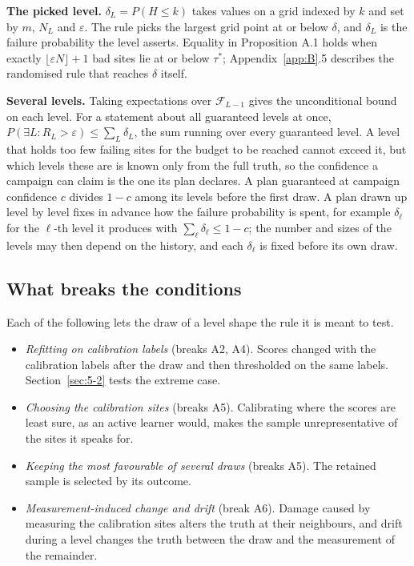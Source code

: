\documentclass{iopjournal}
\providecommand{\tightlist}{\setlength{\itemsep}{0pt}\setlength{\parskip}{0pt}}
\begin{document}
\textbf{The picked level.} \(\delta_L = P(H \le k)\) takes values on a grid indexed by \(k\) and set by \(m\), \(N_L\) and \(\varepsilon\). The rule picks the largest grid point at or below \(\delta\), and \(\delta_L\) is the failure probability the level asserts. Equality in Proposition A.1 holds when exactly \(\lfloor \varepsilon N \rfloor + 1\) bad sites lie at or below \(\tau^\ast\); Appendix~\ref{app:B}.5 describes the randomised rule that reaches \(\delta\) itself.

\textbf{Several levels.} Taking expectations over \(\mathcal{F}_{L-1}\) gives the unconditional bound on each level. For a statement about all guaranteed levels at once, \(P(\exists L : R_L > \varepsilon) \le \sum_L \delta_L\), the sum running over every guaranteed level. A level that holds too few failing sites for the budget to be reached cannot exceed it, but which levels these are is known only from the full truth, so the confidence a campaign can claim is the one its plan declares. A plan guaranteed at campaign confidence \(c\) divides \(1 - c\) among its levels before the first draw. A plan drawn up level by level fixes in advance how the failure probability is spent, for example \(\delta_\ell\) for the \(\ell\)-th level it produces with \(\sum_\ell \delta_\ell \le 1 - c\); the number and sizes of the levels may then depend on the history, and each \(\delta_\ell\) is fixed before its own draw.

\hypertarget{what-breaks-the-conditions}{%
\subsection{What breaks the conditions}\label{what-breaks-the-conditions}}

Each of the following lets the draw of a level shape the rule it is meant to test.

\begin{itemize}
\tightlist
\item
  \emph{Refitting on calibration labels} (breaks A2, A4). Scores changed with the calibration labels after the draw and then thresholded on the same labels. Section~\ref{sec:5-2} tests the extreme case.
\item
  \emph{Choosing the calibration sites} (breaks A5). Calibrating where the scores are least sure, as an active learner would, makes the sample unrepresentative of the sites it speaks for.
\item
  \emph{Keeping the most favourable of several draws} (breaks A5). The retained sample is selected by its outcome.
\item
  \emph{Measurement-induced change and drift} (break A6). Damage caused by measuring the calibration sites alters the truth at their neighbours, and drift during a level changes the truth between the draw and the measurement of the remainder.
\end{itemize}
\end{document}
